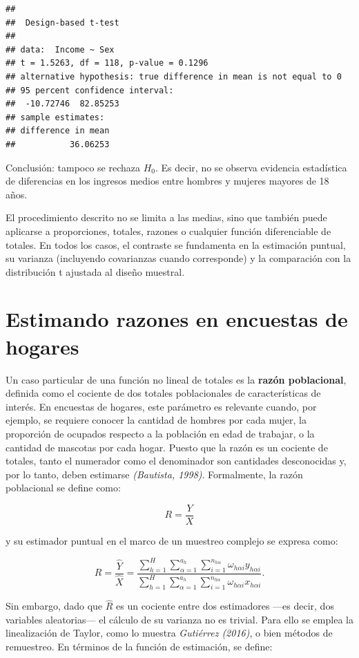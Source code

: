\documentclass[
  12pt,
]{book}
\begin{document}
\begin{verbatim}
## 
##  Design-based t-test
## 
## data:  Income ~ Sex
## t = 1.5263, df = 118, p-value = 0.1296
## alternative hypothesis: true difference in mean is not equal to 0
## 95 percent confidence interval:
##  -10.72746  82.85253
## sample estimates:
## difference in mean 
##           36.06253
\end{verbatim}

Conclusión: tampoco se rechaza \(H_0\). Es decir, no se observa evidencia estadística de diferencias en los ingresos medios entre hombres y mujeres mayores de 18 años.

El procedimiento descrito no se limita a las medias, sino que también puede aplicarse a proporciones, totales, razones o cualquier función diferenciable de totales. En todos los casos, el contraste se fundamenta en la estimación puntual, su varianza (incluyendo covarianzas cuando corresponde) y la comparación con la distribución t ajustada al diseño muestral.

\section{Estimando razones en encuestas de hogares}\label{estimando-razones-en-encuestas-de-hogares}

Un caso particular de una función no lineal de totales es la \textbf{razón poblacional}, definida como el cociente de dos totales poblacionales de características de interés. En encuestas de hogares, este parámetro es relevante cuando, por ejemplo, se requiere conocer la cantidad de hombres por cada mujer, la proporción de ocupados respecto a la población en edad de trabajar, o la cantidad de mascotas por cada hogar. Puesto que la razón es un cociente de totales, tanto el numerador como el denominador son cantidades desconocidas y, por lo tanto, deben estimarse \emph{(Bautista, 1998)}. Formalmente, la razón poblacional se define como:

\[
R = \frac{Y}{X}
\]

y su estimador puntual en el marco de un muestreo complejo se expresa como:

\[
\hat{R} = \frac{\hat{Y}}{\hat{X}}
= \frac{\sum_{h=1}^{H}\sum_{\alpha=1}^{a_{h}}\sum_{i=1}^{n_{h\alpha}}\omega_{h\alpha i} y_{h\alpha i}}
       {\sum_{h=1}^{H}\sum_{\alpha=1}^{a_{h}}\sum_{i=1}^{n_{h\alpha}}\omega_{h\alpha i} x_{h\alpha i}}.
\]

Sin embargo, dado que \(\hat{R}\) es un cociente entre dos estimadores ---es decir, dos variables aleatorias--- el cálculo de su varianza no es trivial. Para ello se emplea la linealización de Taylor, como lo muestra \emph{Gutiérrez (2016)}, o bien métodos de remuestreo. En términos de la función de estimación, se define:
\end{document}
